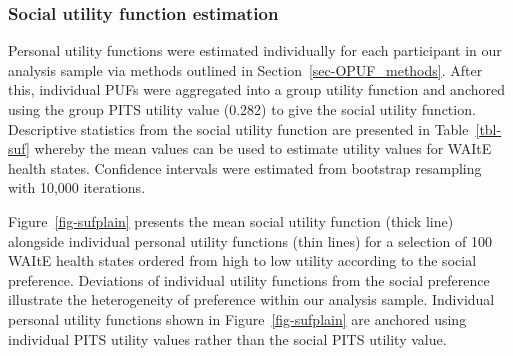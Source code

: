 \documentclass[
  letterpaper,
  DIV=11,
  numbers=noendperiod]{scrartcl}
\begin{document}
\newpage

\subsubsection{Social utility function
estimation}\label{social-utility-function-estimation}

Personal utility functions were estimated individually for each
participant in our analysis sample via methods outlined in
Section~\ref{sec-OPUF_methods}. After this, individual PUFs were
aggregated into a group utility function and anchored using the group
PITS utility value (0.282) to give the social utility function.
Descriptive statistics from the social utility function are presented in
Table~\ref{tbl-suf} whereby the mean values can be used to estimate
utility values for WAItE health states. Confidence intervals were
estimated from bootstrap resampling with 10,000 iterations.

Figure~\ref{fig-sufplain} presents the mean social utility function
(thick line) alongside individual personal utility functions (thin
lines) for a selection of 100 WAItE health states ordered from high to
low utility according to the social preference. Deviations of individual
utility functions from the social preference illustrate the
heterogeneity of preference within our analysis sample. Individual
personal utility functions shown in Figure~\ref{fig-sufplain} are
anchored using individual PITS utility values rather than the social
PITS utility value.
\end{document}

